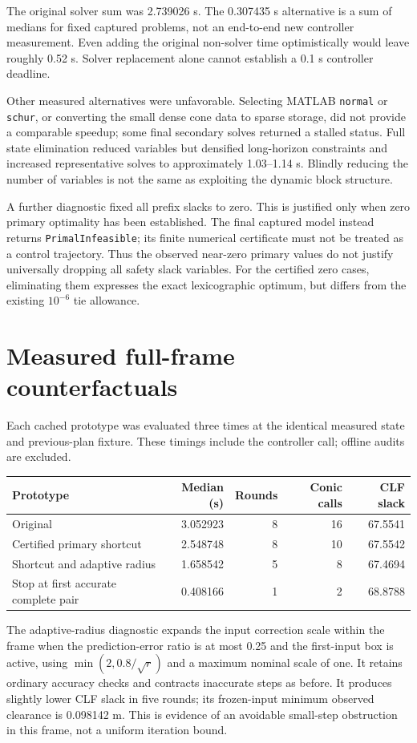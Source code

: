 \documentclass[11pt]{article}
\begin{document}
The original solver sum was 2.739026 s. The 0.307435 s alternative is a
sum of medians for fixed captured problems, not an end-to-end new controller
measurement. Even adding the original non-solver time optimistically would
leave roughly 0.52 s. Solver replacement alone cannot establish a 0.1 s
controller deadline.

Other measured alternatives were unfavorable. Selecting MATLAB
\texttt{normal} or \texttt{schur}, or converting the small dense cone data
to sparse storage, did not provide a comparable speedup; some final
secondary solves returned a stalled status. Full state elimination reduced
variables but densified long-horizon constraints and increased representative
solves to approximately 1.03--1.14 s. Blindly reducing the number of variables
is not the same as exploiting the dynamic block structure.

A further diagnostic fixed all prefix slacks to zero. This is justified only
when zero primary optimality has been established. The final captured model
instead returns \texttt{PrimalInfeasible}; its finite numerical certificate
must not be treated as a control trajectory. Thus the observed near-zero
primary values do not justify universally dropping all safety slack variables.
For the certified zero cases, eliminating them expresses the exact
lexicographic optimum, but differs from the existing $10^{-6}$ tie allowance.

\section{Measured full-frame counterfactuals}
Each cached prototype was evaluated three times at the identical measured
state and previous-plan fixture. These timings include the controller call;
offline audits are excluded.
\begin{center}\small\begin{tabular}{lrrrr}\toprule
Prototype & Median (s) & Rounds & Conic calls & CLF slack\\\midrule
Original & 3.052923 & 8 & 16 & 67.5541\\
Certified primary shortcut & 2.548748 & 8 & 10 & 67.5542\\
Shortcut and adaptive radius & 1.658542 & 5 & 8 & 67.4694\\
Stop at first accurate complete pair & 0.408166 & 1 & 2 & 68.8788\\\bottomrule\end{tabular}\end{center}
The adaptive-radius diagnostic expands the input correction scale within the
frame when the prediction-error ratio is at most 0.25 and the first-input
box is active, using $\min(2,0.8/\sqrt r)$ and a maximum nominal scale of one.
It retains ordinary accuracy checks and contracts inaccurate steps as before.
It produces slightly lower CLF slack in five rounds; its frozen-input minimum
observed clearance is 0.098142 m. This is evidence of an avoidable small-step
obstruction in this frame, not a uniform iteration bound.
\end{document}
